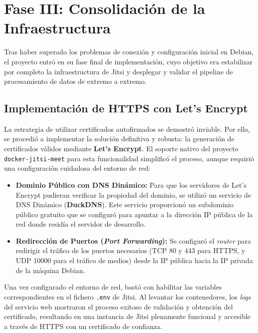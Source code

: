 \section{Fase III: Consolidación de la Infraestructura}
\label{sec:desarrollo_acto_final}

Tras haber superado los problemas de conexión y configuración inicial en Debian, el proyecto entró en su fase final de implementación, cuyo objetivo era estabilizar por completo la infraestructura de Jitsi y desplegar y validar el pipeline de procesamiento de datos de extremo a extremo.

\subsection{Implementación de HTTPS con Let's Encrypt}
La estrategia de utilizar certificados autofirmados se demostró inviable. Por ello, se procedió a implementar la solución definitiva y robusta: la generación de certificados válidos mediante \textbf{Let's Encrypt}. El soporte nativo del proyecto \texttt{docker-jitsi-meet} para esta funcionalidad simplificó el proceso, aunque requirió una configuración cuidadosa del entorno de red:

\begin{itemize}
    \item \textbf{Dominio Público con DNS Dinámico:} Para que los servidores de Let's Encrypt pudieran verificar la propiedad del dominio, se utilizó un servicio de DNS Dinámico (\textbf{DuckDNS}). Este servicio proporcionó un subdominio público gratuito que se configuró para apuntar a la dirección IP pública de la red donde residía el servidor de desarrollo.
    
    \item \textbf{Redirección de Puertos (\textit{Port Forwarding}):} Se configuró el \textit{router} para redirigir el tráfico de los puertos necesarios (TCP 80 y 443 para HTTPS, y UDP 10000 para el tráfico de medios) desde la IP pública hacia la IP privada de la máquina Debian.
\end{itemize}

Una vez configurado el entorno de red, bastó con habilitar las variables correspondientes en el fichero \texttt{.env} de Jitsi. Al levantar los contenedores, los \textit{logs} del servicio web mostraron el proceso exitoso de validación y obtención del certificado, resultando en una instancia de Jitsi plenamente funcional y accesible a través de HTTPS con un certificado de confianza.

